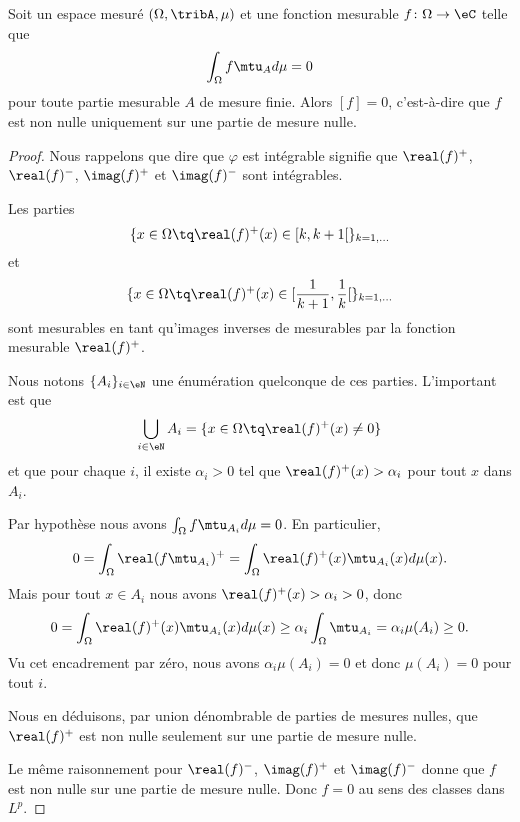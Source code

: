 \begin{proposition} \label{PropRERZooYcEchc}
    Soit un espace mesuré \( (\Omega,\tribA,\mu)\) et une fonction mesurable \( f\colon \Omega\to \eC \) telle que
    \begin{equation}
        \int_{\Omega}f\mtu_Ad\mu=0
    \end{equation}
    pour toute partie mesurable \( A\) de mesure finie. Alors \( [f]=0\), c'est-à-dire que \( f\) est non nulle uniquement sur une partie de mesure nulle.
\end{proposition}

\begin{proof}
    Nous rappelons que dire que \( \varphi\) est intégrable signifie que \( \real(f)^+\), \( \real(f)^-\), \( \imag(f)^+\) et \( \imag(f)^-\) sont intégrables.

    Les parties
    \begin{equation}
        \{ x\in \Omega \tq \real(f)^+(x)\in \mathopen[ k , k+1 \mathclose[ \}_{k=1,\ldots}
    \end{equation}
    et
    \begin{equation}
        \{ x\in \Omega \tq \real(f)^+(x)\in \mathopen[ \frac{1}{ k+1 } , \frac{1}{ k } \mathclose[ \}_{k=1,\ldots}
    \end{equation}
    sont mesurables en tant qu'images inverses de mesurables par la fonction mesurable \( \real(f)^+\).

    Nous notons \( \{ A_i \}_{i\in \eN}\) une énumération quelconque de ces parties. L'important est que
    \begin{equation}
        \bigcup_{i\in \eN}A_i=\{ x\in \Omega\tq \real(f)^+(x)\neq 0 \}
    \end{equation}
    et que pour chaque \( i\), il existe \( \alpha_i>0\) tel que \( \real(f)^+(x)>\alpha_i\) pour tout \( x\) dans \( A_i\).

    Par hypothèse nous avons \( \int_{\Omega}f\mtu_{A_i}d\mu=0\). En particulier,
    \begin{equation}
        0=\int_{\Omega}\real(f\mtu_{A_i})^+=\int_{\Omega}\real(f)^+(x)\mtu_{A_i}(x)d\mu(x).
    \end{equation}
    Mais pour tout \( x\in A_i\) nous avons \( \real(f)^+(x)>\alpha_i>0\), donc
    \begin{equation}
        0=\int_{\Omega}\real(f)^+(x)\mtu_{A_i}(x)d\mu(x)\geq \alpha_i\int_{\Omega}\mtu_{A_i}=\alpha_i\mu(A_i)\geq 0.
    \end{equation}
    Vu cet encadrement par zéro, nous avons \( \alpha_i\mu(A_i)=0\) et donc \( \mu(A_i)=0\) pour tout \( i\).

    Nous en déduisons, par union dénombrable de parties de mesures nulles, que \( \real(f)^+\) est non nulle seulement sur une partie de mesure nulle.

    Le même raisonnement pour \( \real(f)^-\), \( \imag(f)^+\) et \( \imag(f)^-\) donne que \( f\) est non nulle sur une partie de mesure nulle. Donc \( f=0\) au sens des classes dans \( L^p\).
\end{proof}

